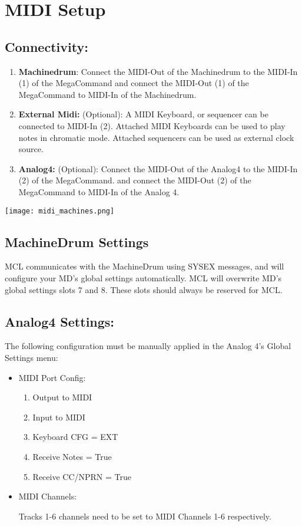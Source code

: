 \chapter{MIDI Setup}
\section{Connectivity:}

\begin{enumerate}
\item\textbf{Machinedrum}:
Connect the MIDI-Out of the Machinedrum to the MIDI-In (1) of the MegaCommand and connect the MIDI-Out (1) of the MegaCommand to MIDI-In of the Machinedrum.

\item\textbf{External Midi:} (Optional): 
A MIDI Keyboard, or sequencer can be connected to MIDI-In (2). Attached MIDI Keyboards can be used to play notes in chromatic mode. Attached sequencers can be used as external clock source.

\item\textbf{Analog4:} (Optional):
Connect the MIDI-Out of the Analog4 to the MIDI-In (2) of the MegaCommand. and connect the MIDI-Out (2) of the MegaCommand to MIDI-In of the Analog 4.
\end{enumerate}
\texttt{[image: midi\_machines.png]}
\\
\newpage
\section{MachineDrum Settings }

MCL communicates with the MachineDrum using SYSEX messages, and will configure your MD's global settings automatically. MCL will overwrite MD's global settings slots 7 and 8. These slots should always be reserved for MCL.

\section{Analog4 Settings:}

The following configuration must be manually applied in the Analog 4's Global Settings menu:

\begin{itemize}

\item{MIDI Port Config:}
\begin{enumerate}
\item{Output to MIDI}
\item{Input to MIDI}
\item{Keyboard CFG = EXT}
\item{Receive Notes = True}
\item{Receive CC/NPRN = True}
\end{enumerate}
\item{MIDI Channels:}

Tracks 1-6 channels need to be set to MIDI Channels 1-6 respectively.

\end{itemize}

